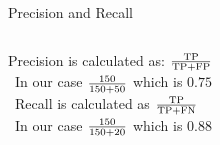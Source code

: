 \documentclass[handout]{beamer}
\begin{document}
\begin{frame}{Precision and Recall} 
	
	\begin{columns}
		Precision is calculated as: \(\frac{\rm{TP}}{\rm{TP}+\rm{FP}}\) \\\
		In our case \(\frac{\rm{150}}{\rm{150}+\rm{50}}\) which is \(0.75\) \\\
		Recall is calculated as \(\frac{\rm{TP}}{\rm{TP}+\rm{FN}}\) \\\
		In our case \(\frac{\rm{150}}{\rm{150}+\rm{20}}\) which is \(0.88\)
	\end{columns}




\end{frame}
\end{document}

